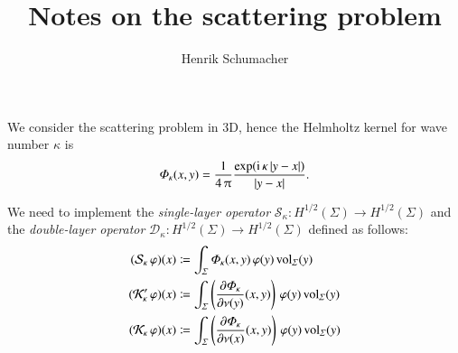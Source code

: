 \documentclass[
	,12pt%
	,pagesize%
	,headings=small%
	,paper=a4%
	,parskip=false%
	,abstract=on
	,toc=bibliography
]{scrartcl}
\theoremstyle{definition}
\theoremstyle{remark}
\begin{document}
\title{Notes on the scattering problem}
\author{%
Henrik Schumacher
}

\maketitle

%
%
%

We consider the scattering problem in 3D, hence the Helmholtz kernel for wave number $\kappa$ is
\begin{align*}
	\varPhi_\kappa(x,y) = \frac{1}{4 \, \uppi} \frac{\exp({\operatorname{i}} \, \kappa \, \lvert{y-x}\rvert)}{\lvert{y-x}\rvert}. 
\end{align*}

We need to implement 
the \emph{single-layer operator} $\mathcal{S}_\kappa \colon H^{1/2}(\varSigma) \to H^{1/2}(\varSigma)$ 
and 
the \emph{double-layer operator} $\mathcal{D}_\kappa \colon H^{1/2}(\varSigma) \to H^{1/2}(\varSigma)$ 
defined as follows:
\begin{align*}
	(\mathcal{S}_\kappa \, \varphi)(x)
	&\coloneqq
	\int_{\varSigma}
		\varPhi_\kappa(x,y) \, \varphi(y)
	\, {\operatorname{vol}}_\varSigma(y)
	\\
	(\mathcal{K}_\kappa' \, \varphi)(x)
	&\coloneqq
	\int_{\varSigma}
		\left( \frac{\partial \varPhi_\kappa}{\partial \nu(y)}(x,y) \right) \, \varphi(y)
	\, {\operatorname{vol}}_\varSigma(y)
	\\
	(\mathcal{K}_\kappa \, \varphi)(x)
	&\coloneqq
	\int_{\varSigma}
		\left( \frac{\partial \varPhi_\kappa}{\partial \nu(x)}(x,y) \right) \, \varphi(y)
	\, {\operatorname{vol}}_\varSigma(y)
\end{align*}
\end{document}
